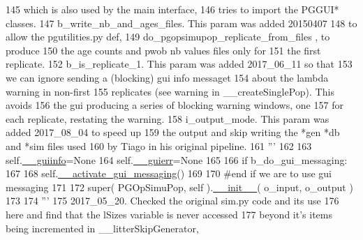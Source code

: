 \begin{DoxyCode}
145 \textcolor{stringliteral}{                which is also used by the main interface,}
146 \textcolor{stringliteral}{                tries to import the PGGUI* classes.  }
147 \textcolor{stringliteral}{            b\_write\_nb\_and\_ages\_files.  This param was added 20150407}
148 \textcolor{stringliteral}{                to allow the pgutilities.py def, }
149 \textcolor{stringliteral}{                do\_pgopsimupop\_replicate\_from\_files , to produce}
150 \textcolor{stringliteral}{                the age counts and pwob nb values files only for}
151 \textcolor{stringliteral}{                the first replicate.}
152 \textcolor{stringliteral}{            b\_is\_replicate\_1.  This param was added 2017\_06\_11 so that}
153 \textcolor{stringliteral}{                we can ignore sending a (blocking) gui info messaget}
154 \textcolor{stringliteral}{                about the lambda warning in non-first}
155 \textcolor{stringliteral}{                replicates (see warning in \_\_createSinglePop).  This avoids}
156 \textcolor{stringliteral}{                the gui producing a series of blocking warning windows, one}
157 \textcolor{stringliteral}{                for each replicate, restating the warning.}
158 \textcolor{stringliteral}{            i\_output\_mode.  This param was added 2017\_08\_04 to speed up}
159 \textcolor{stringliteral}{                the output and skip writing the *gen *db and *sim files used}
160 \textcolor{stringliteral}{                by Tiago in his original pipeline.  }
161 \textcolor{stringliteral}{            '''}
162 
163         self.\hyperlink{classnegui_1_1pgopsimupop_1_1PGOpSimuPop_ab3796118d27c8ed2303e432f6a00f4af}{\_\_guiinfo}=\textcolor{keywordtype}{None}
164         self.\hyperlink{classnegui_1_1pgopsimupop_1_1PGOpSimuPop_a03370ae1435e2f26d672cd66a876b43c}{\_\_guierr}=\textcolor{keywordtype}{None}
165 
166         \textcolor{keywordflow}{if} b\_do\_gui\_messaging:
167 
168             self.\hyperlink{classnegui_1_1pgopsimupop_1_1PGOpSimuPop_a1c0f5251ae8460fa0207d2948e83ccff}{\_\_activate\_gui\_messaging}()
169 
170         \textcolor{comment}{#end if we are to use gui messaging}
171 
172         super( PGOpSimuPop, self ).\hyperlink{classnegui_1_1pgopsimupop_1_1PGOpSimuPop_a31cc8447a10c56667ae42093fb489c47}{\_\_init\_\_}( o\_input, o\_output )
173 
174         \textcolor{stringliteral}{'''}
175 \textcolor{stringliteral}{        2017\_05\_20.  Checked the original sim.py code and its use }
176 \textcolor{stringliteral}{        here and find that the lSizes variable is never accessed}
177 \textcolor{stringliteral}{        beyond it's items being incremented in \_\_litterSkipGenerator,}

\end{DoxyCode}
